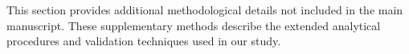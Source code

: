 This section provides additional methodological details not included in the main manuscript. 
These supplementary methods describe the extended analytical procedures and validation techniques used in our study.
